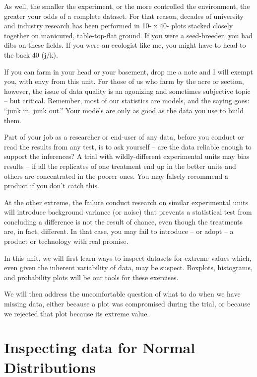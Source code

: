 \documentclass[
]{book}
\begin{document}
As well, the smaller the experiment, or the more controlled the environment, the greater your odds of a complete dataset. For that reason, decades of university and industry research has been performed in 10- x 40- plots stacked closely together on manicured, table-top-flat ground. If you were a seed-breeder, you had dibs on these fields. If you were an ecologist like me, you might have to head to the back 40 (j/k).

If you can farm in your head or your basement, drop me a note and I will exempt you, with envy from this unit. For those of us who farm by the acre or section, however, the issue of data quality is an agonizing and sometimes subjective topic -- but critical. Remember, most of our statistics are models, and the saying goes: ``junk in, junk out.'' Your models are only as good as the data you use to build them.

Part of your job as a researcher or end-user of any data, before you conduct or read the results from any test, is to ask yourself -- are the data reliable enough to support the inferences? A trial with wildly-different experimental units may bias results -- if all the replicates of one treatment end up in the better units and others are concentrated in the poorer ones. You may falsely recommend a product if you don't catch this.

At the other extreme, the failure conduct research on similar experimental units will introduce background variance (or noise) that prevents a statistical test from concluding a difference is not the result of chance, even though the treatments are, in fact, different. In that case, you may fail to introduce -- or adopt -- a product or technology with real promise.

In this unit, we will first learn ways to inspect datasets for extreme values which, even given the inherent variability of data, may be suspect. Boxplots, histograms, and probability plots will be our tools for these exercises.

We will then address the uncomfortable question of what to do when we have missing data, either because a plot was compromised during the trial, or because we rejected that plot because its extreme value.

\hypertarget{inspecting-data-for-normal-distributions}{%
\section{Inspecting data for Normal Distributions}\label{inspecting-data-for-normal-distributions}}
\end{document}

